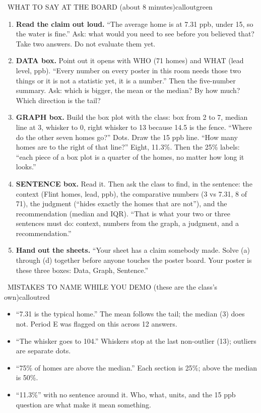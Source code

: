 \documentclass[12pt]{article}
\begin{document}
\newpage
\pagestyle{empty}

\begin{callout}{\IconSpeak\ WHAT TO SAY AT THE BOARD (about 8 minutes)}{calloutgreen}
\begin{enumerate}[leftmargin=1.6em,itemsep=4pt]
  \item \textbf{Read the claim out loud.} ``The average home is at 7.31 ppb, under 15, so the water is fine.'' Ask: what would you need to see before you believed that? Take two answers. Do not evaluate them yet.
  \item \textbf{DATA box.} Point out it opens with WHO (71 homes) and WHAT (lead level, ppb). ``Every number on every poster in this room needs those two things or it is not a statistic yet, it is a number.'' Then the five-number summary. Ask: which is bigger, the mean or the median? By how much? Which direction is the tail?
  \item \textbf{GRAPH box.} Build the box plot with the class: box from 2 to 7, median line at 3, whisker to 0, right whisker to 13 because 14.5 is the fence. ``Where do the other seven homes go?'' Dots. Draw the 15 ppb line. ``How many homes are to the right of that line?'' Eight, 11.3\%. Then the 25\% labels: ``each piece of a box plot is a quarter of the homes, no matter how long it looks.''
  \item \textbf{SENTENCE box.} Read it. Then ask the class to find, in the sentence: the context (Flint homes, lead, ppb), the comparative numbers (3 vs 7.31, 8 of 71), the judgment (``hides exactly the homes that are not''), and the recommendation (median and IQR). ``That is what your two or three sentences must do: context, numbers from the graph, a judgment, and a recommendation.''
  \item \textbf{Hand out the sheets.} ``Your sheet has a claim somebody made. Solve (a) through (d) together before anyone touches the poster board. Your poster is these three boxes: Data, Graph, Sentence.''
\end{enumerate}
\end{callout}

\begin{callout}{\IconWarn\ MISTAKES TO NAME WHILE YOU DEMO (these are the class's own)}{calloutred}
\begin{itemize}[leftmargin=1.4em,itemsep=2pt]
  \item ``7.31 is the typical home.'' The mean follows the tail; the median (3) does not. Period E was flagged on this across 12 answers.
  \item ``The whisker goes to 104.'' Whiskers stop at the last non-outlier (13); outliers are separate dots.
  \item ``75\% of homes are above the median.'' Each section is 25\%; above the median is 50\%.
  \item ``11.3\%'' with no sentence around it. Who, what, units, and the 15 ppb question are what make it mean something.
\end{itemize}
\end{callout}
\end{document}
